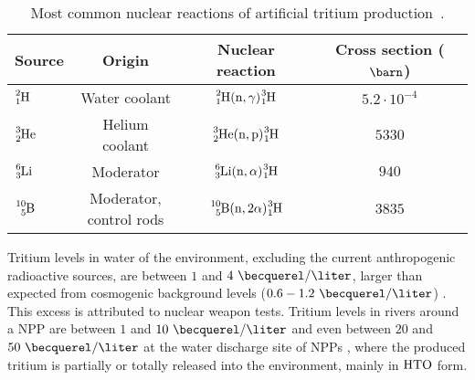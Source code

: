 \begin{table}[htbp]
\centering{}%
\begin{tabular}{lccc}
\toprule 
Source & Origin & Nuclear reaction & Cross section ($\barn$)\tabularnewline
\midrule
\midrule 
$\ce{^{2}_{1}H}$ & Water coolant & $\ce{^{2}_{1}H}(\ce{n},\gamma)\ce{^{3}_{1}H}$ & $5.2 \cdot{} 10^{-4}$ \tabularnewline
$\ce{^{3}_{2}He}$ & Helium coolant & $\ce{^{3}_{2}He}(\ce{n},\ce{p})\ce{^{3}_{1}H}$ & $5330$ \tabularnewline
\vspace{0.1cm}$\ce{^{6}_{3}Li}$ & Moderator & $\ce{^{6}_{3}Li}(\ce{n},\alpha)\ce{^{3}_{1}H}$ & $940$ \tabularnewline
$\ce{^{10}_{5}B}$ & \parbox{8em}{\centering Moderator,\\ control rods} & $\ce{^{10}_{5}B}(\ce{n},2\alpha)\ce{^{3}_{1}H}$ & $3835$ \tabularnewline 
\bottomrule
\end{tabular}
\caption{Most common nuclear reactions of artificial tritium production~\cite{CommonEmissionTritium}.}
\label{tab:NuclearReactionsTritiumProduction}
\end{table}

Tritium levels in water of the environment, excluding the current anthropogenic radioactive sources, are between $1$ and $4~\becquerel/\liter$, larger than expected from cosmogenic background levels ($0.6-1.2~\becquerel/\liter$) \cite{FranceTritiumEnvironment}. This excess is attributed to nuclear weapon tests. Tritium levels in rivers around a NPP are between $1$ and $10~\becquerel/\liter$ and even between $20$ and $50~\becquerel/\liter$ at the water discharge site of NPPs \cite{FranceTritiumEnvironment}, where the produced tritium is partially or totally released into the environment, mainly in $\ce{HTO}$ form.

